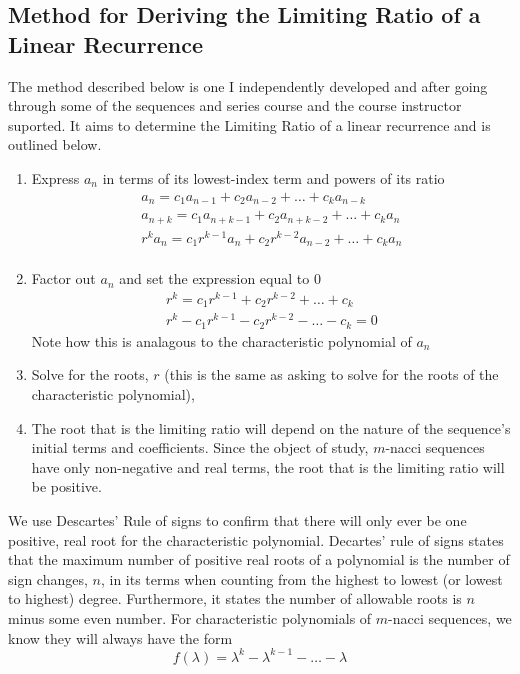 \documentclass[11pt]{article}
\begin{document}
\subsection{Method for Deriving the Limiting Ratio of a Linear Recurrence}
The method described below is one I independently developed and after going through some of the sequences and series course and the course instructor suported. It aims to determine the Limiting Ratio of a linear recurrence and is outlined below.
\begin{enumerate}
    \item Express $a_n$ in terms of its lowest-index term and powers of its ratio 
    \begin{align*}
        a_n=c_1a_{n-1}+c_2a_{n-2}+\dots +c_ka_{n-k} \\
        a_{n+k}=c_1a_{n+k-1}+c_2a_{n+k-2}+\dots +c_ka_{n} \\
        r^{k}a_{n}=c_1r^{k-1}a_{n}+c_2r^{k-2}a_{n-2}+\dots +c_ka_{n} \\
    \end{align*}
    \item Factor out $a_n$ and set the expression equal to 0
    \begin{align*}
        r^{k}=c_1r^{k-1}+c_2r^{k-2}+\dots +c_k \\
        r^{k}-c_1r^{k-1}-c_2r^{k-2}-\dots -c_k=0
    \end{align*}
    Note how this is analagous to the characteristic polynomial of $a_n$
    \item Solve for the roots, $r$ (this is the same as asking to solve for the roots of the characteristic polynomial), 
    \item The root that is the limiting ratio will depend on the nature of the sequence's initial terms and coefficients. Since the object of study, \(m\)-nacci sequences have only non-negative and real terms, the root that is the limiting ratio will be positive. 
\end{enumerate}
We use Descartes' Rule of signs to confirm that there will only ever be one positive, real root for the characteristic polynomial. Decartes' rule of signs states that the maximum number of positive real roots of a polynomial is the number of sign changes, \(n\), in its terms when counting from the highest to lowest (or lowest to highest) degree. Furthermore, it states the number of allowable roots is \(n\) minus some even number. 
For characteristic polynomials of \(m\)-nacci sequences, we know they will always have the form 
\[f(\lambda)=\lambda^{k}-\lambda^{k-1}-\dots-\lambda\]
\end{document}
